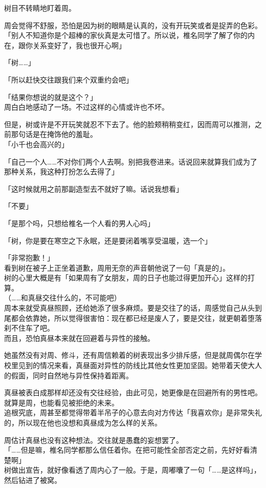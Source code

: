 树目不转睛地盯着周。

周会觉得不舒服，恐怕是因为树的眼睛是认真的，没有开玩笑或者是捉弄的色彩。\\

「别人不知道你是个超棒的家伙真是太可惜了。所以说，椎名同学了解了你的内在，跟你关系变好了，我也很开心啊」

「树……」

「所以赶快交往跟我们来个双重约会吧」

「结果你想说的就是这个？」\\

周白白地感动了一场。不过这样的心情或许也不坏。

但是，树或许是不开玩笑就忍不下去了。他的脸颊稍稍变红，因而周可以推测，之前那句话是在掩饰他的羞耻。\\

「小千也会高兴的」

「自己一个人……不对你们两个人去啊。别把我卷进来。话说回来就算我们成为了那种关系，我这种打扮怎么去得了」

「这时候就用之前那副造型去不就好了嘛。话说我想看」

「不要」

「是那个吗，只想给椎名一个人看的男人心吗」

「树，你是要在寒空之下永眠，还是要闭着嘴享受温暖，选一个」

「非常抱歉！」\\

看到树在被子上正坐着道歉，周用无奈的声音朝他说了一句「真是的」。\\

树的心里大概是有「如果周有了女朋友，周的日子也能过得更加开心」这样的打算。\\

（……和真昼交往什么的，不可能吧）\\

周本来就受真昼照顾，还给她添了很多麻烦。要是交往了的话，周感觉自己从头到尾都会依靠她，所以觉得很害怕：现在都已经是废人了，要是交往，就更朝着堕落刹不住车了吧。\\

而且，恐怕真昼本来就在回避着与异性的接触。

她虽然没有对周、修斗，还有周信赖着的树表现出多少排斥感，但是就周偶尔在学校里见到的情况来看，真昼面对异性的防线比其他女性更加坚固。她带着天使大人的假面，同时自然地与异性保持着距离。

真昼被表白成那样却还没有交往经验，由此可见，她更像是在回避所有的男性吧。\\

就算是周，也能看见被拒绝的未来。\\

追根究底，周甚至都觉得带着半吊子的心意去向对方传达「我喜欢你」是非常失礼的，所以现在他也没想和真昼成为怎么样的关系。

周估计真昼也没有这种想法。交往就是愚蠢的妄想罢了。\\

「……但是嘛，椎名同学都那么信任着你。在把可能性全部否定之前，先好好看清楚啊」\\

树做出宣告，就好像看透了周内心了一般。于是，周嘟囔了一句「……是这样吗」，然后钻进了被窝。
